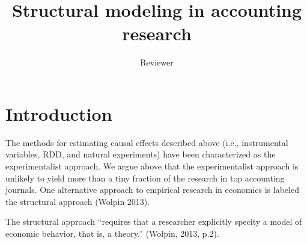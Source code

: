 \documentclass[11pt]{amsart}
\title[Structural modeling]{Structural modeling in accounting research}
\author{Reviewer}
\begin{document}
\section{Introduction}
The methods for estimating causal effects described above (i.e., instrumental variables, RDD, and natural experiments) have been characterized as the experimentalist approach. 
We argue above that the experimentalist approach is unlikely to yield more than a tiny fraction of the research in top accounting journals. One alternative approach to empirical research in economics is labeled the structural approach (Wolpin 2013).

The structural approach ``requires that a researcher explicitly specity a model of economic behavior, that is, a theory." (Wolpin, 2013, p.2).
\end{document}
